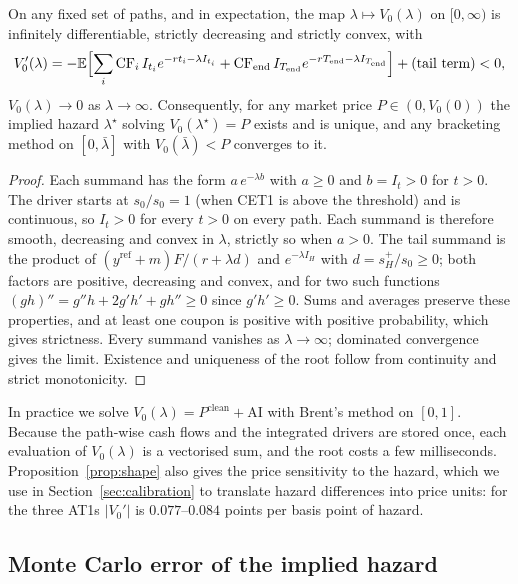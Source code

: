 \begin{proposition}\label{prop:shape}
On any fixed set of paths, and in expectation, the map $\lambda\mapsto V_0(\lambda)$ on
$[0,\infty)$ is infinitely differentiable, strictly decreasing and strictly convex, with
\begin{equation}\label{eq:dv}
  V_0'(\lambda) = -\mathbb{E}\Bigl[\sum_i\mathrm{CF}_i\,I_{t_i}e^{-rt_i-\lambda I_{t_i}}
  + \mathrm{CF}_{\mathrm{end}}\,I_{T_{\mathrm{end}}}e^{-rT_{\mathrm{end}}-\lambda I_{T_{\mathrm{end}}}}\Bigr]
  + \text{(tail term)} <0,
\end{equation}
$V_0(\lambda)\to0$ as $\lambda\to\infty$. Consequently, for any market price
$P\in(0,V_0(0))$ the implied hazard $\lambda^\star$ solving $V_0(\lambda^\star)=P$ exists
and is unique, and any bracketing method on $[0,\bar\lambda]$ with
$V_0(\bar\lambda)<P$ converges to it.
\end{proposition}

\begin{proof}
Each summand has the form $a\,e^{-\lambda b}$ with $a\ge0$ and $b=I_t>0$ for $t>0$. The
driver starts at $s_0/s_0=1$ (when CET1 is above the threshold) and is continuous, so
$I_t>0$ for every $t>0$ on every path. Each summand is therefore smooth, decreasing and
convex in $\lambda$, strictly so when $a>0$. The tail summand is the product of
$(y^{\mathrm{ref}}+m)F/(r+\lambda d)$ and $e^{-\lambda I_H}$ with $d=s_H^+/s_0\ge0$; both
factors are positive, decreasing and convex, and for two such functions
$(gh)''=g''h+2g'h'+gh''\ge0$ since $g'h'\ge0$. Sums and averages preserve these
properties, and at least one coupon is positive with positive probability, which gives
strictness. Every summand vanishes as $\lambda\to\infty$; dominated convergence gives the
limit. Existence and uniqueness of the root follow from continuity and strict
monotonicity.
\end{proof}

In practice we solve $V_0(\lambda)=P^{\mathrm{clean}}+\mathrm{AI}$ with Brent's method
\citep{Brent1973} on $[0,1]$. Because the path-wise cash flows and the integrated
drivers are stored once, each evaluation of $V_0(\lambda)$ is a vectorised sum, and the
root costs a few milliseconds. Proposition~\ref{prop:shape} also gives the price
sensitivity to the hazard, which we use in Section~\ref{sec:calibration} to translate
hazard differences into price units: for the three AT1s $|V_0'|$ is $0.077$--$0.084$
points per basis point of hazard.

\subsection{Monte Carlo error of the implied hazard}

